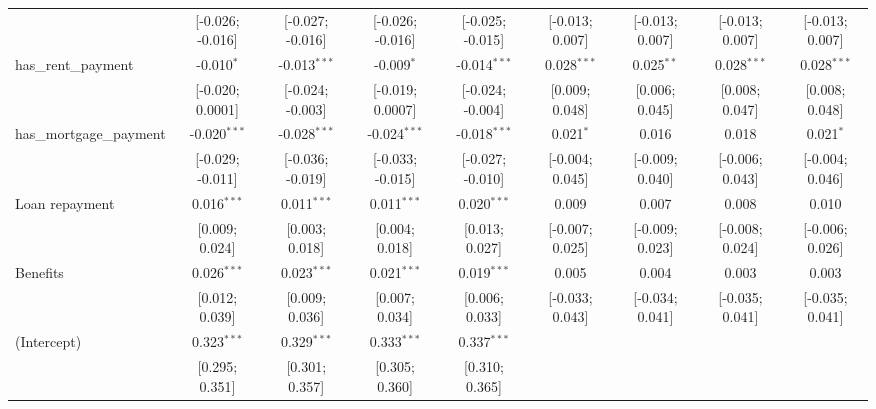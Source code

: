 \begin{table}[htbp]
\begin{threeparttable}[b]
\begin{tabular}{lcccccccc}
                                  & [-0.026; -0.016]               & [-0.027; -0.016] & [-0.026; -0.016] & [-0.025; -0.015] & [-0.013; 0.007] & [-0.013; 0.007] & [-0.013; 0.007] & [-0.013; 0.007]\\   
         has\_rent\_payment       & -0.010$^{*}$                   & -0.013$^{***}$   & -0.009$^{*}$     & -0.014$^{***}$   & 0.028$^{***}$   & 0.025$^{**}$    & 0.028$^{***}$   & 0.028$^{***}$\\   
                                  & [-0.020; 0.0001]               & [-0.024; -0.003] & [-0.019; 0.0007] & [-0.024; -0.004] & [0.009; 0.048]  & [0.006; 0.045]  & [0.008; 0.047]  & [0.008; 0.048]\\   
         has\_mortgage\_payment   & -0.020$^{***}$                 & -0.028$^{***}$   & -0.024$^{***}$   & -0.018$^{***}$   & 0.021$^{*}$     & 0.016           & 0.018           & 0.021$^{*}$\\   
                                  & [-0.029; -0.011]               & [-0.036; -0.019] & [-0.033; -0.015] & [-0.027; -0.010] & [-0.004; 0.045] & [-0.009; 0.040] & [-0.006; 0.043] & [-0.004; 0.046]\\   
         Loan repayment           & 0.016$^{***}$                  & 0.011$^{***}$    & 0.011$^{***}$    & 0.020$^{***}$    & 0.009           & 0.007           & 0.008           & 0.010\\   
                                  & [0.009; 0.024]                 & [0.003; 0.018]   & [0.004; 0.018]   & [0.013; 0.027]   & [-0.007; 0.025] & [-0.009; 0.023] & [-0.008; 0.024] & [-0.006; 0.026]\\   
         Benefits                 & 0.026$^{***}$                  & 0.023$^{***}$    & 0.021$^{***}$    & 0.019$^{***}$    & 0.005           & 0.004           & 0.003           & 0.003\\   
                                  & [0.012; 0.039]                 & [0.009; 0.036]   & [0.007; 0.034]   & [0.006; 0.033]   & [-0.033; 0.043] & [-0.034; 0.041] & [-0.035; 0.041] & [-0.035; 0.041]\\   
         (Intercept)              & 0.323$^{***}$                  & 0.329$^{***}$    & 0.333$^{***}$    & 0.337$^{***}$    &                 &                 &                 &   \\   
                                  & [0.295; 0.351]                 & [0.301; 0.357]   & [0.305; 0.360]   & [0.310; 0.365]   &                 &                 &                 &   \\   
         \midrule

\end{tabular}
\end{threeparttable}
\end{table}

